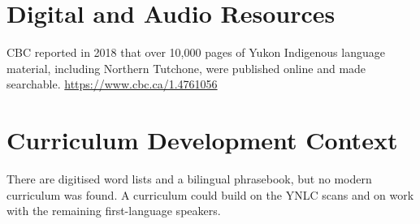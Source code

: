 \documentclass[12pt]{article}
\begin{document}
\section{Digital and Audio Resources}
CBC reported in 2018 that over 10,000 pages of Yukon Indigenous language material, including Northern Tutchone, were published online and made searchable. \url{https://www.cbc.ca/1.4761056}
\section{Curriculum Development Context}
There are digitised word lists and a bilingual phrasebook, but no modern curriculum was found. A curriculum could build on the YNLC scans and on work with the remaining first-language speakers.
\end{document}
